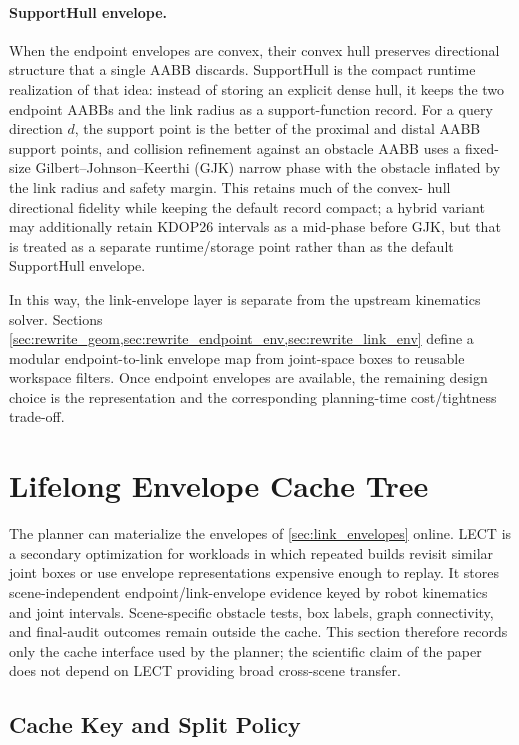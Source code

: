 \documentclass[journal]{IEEEtran}
\begin{document}
\paragraph{SupportHull envelope.}
When the endpoint envelopes are convex, their convex hull preserves directional
structure that a single AABB discards. SupportHull is the compact runtime
realization of that idea: instead of storing an explicit dense hull, it keeps
the two endpoint AABBs and the link radius as a support-function record. For a
query direction $d$, the support point is the better of the proximal and distal
AABB support points, and collision refinement against an obstacle AABB uses a
fixed-size Gilbert--Johnson--Keerthi (GJK) narrow phase with the obstacle
inflated by the link radius and safety margin. This retains much of the convex-
hull directional fidelity while keeping the default record compact; a hybrid
variant may additionally retain KDOP26 intervals as a mid-phase before GJK,
but that is treated as a separate runtime/storage point rather than as the
default SupportHull envelope.

In this way, the link-envelope layer is separate from the upstream kinematics solver.
Sections \cref{sec:rewrite_geom,sec:rewrite_endpoint_env,sec:rewrite_link_env}
define a modular endpoint-to-link envelope map from joint-space boxes to reusable
workspace filters. Once endpoint envelopes are available, the remaining design
choice is the representation and the corresponding planning-time cost/tightness
trade-off.

\section{Lifelong Envelope Cache Tree}\label{sec:lect}

The planner can materialize the envelopes of \cref{sec:link_envelopes} online.
LECT is a secondary optimization for workloads in which repeated builds revisit
similar joint boxes or use envelope representations expensive enough to replay.
It stores scene-independent endpoint/link-envelope evidence keyed by robot
kinematics and joint intervals. Scene-specific obstacle tests, box labels,
graph connectivity, and final-audit outcomes remain outside the cache. This
section therefore records only the cache interface used by the planner; the
scientific claim of the paper does not depend on LECT providing broad
cross-scene transfer.

\subsection{Cache Key and Split Policy}\label{sec:lect_design}\label{sec:lect_split}
\end{document}
